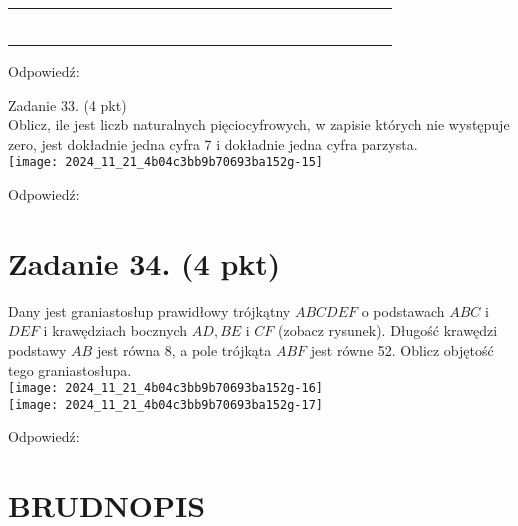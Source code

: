 \documentclass[10pt]{article}
\begin{document}
\begin{center}
\begin{tabular}{|c|c|c|c|c|c|c|c|c|c|c|c|c|c|c|c|c|c|c|c|c|c|c|c|}
\hline
 &  &  &  &  &  &  &  &  &  &  &  &  &  &  &  &  &  &  &  &  &  &  &  \\
\hline
 &  &  &  &  &  &  &  &  &  &  &  &  &  &  &  &  &  &  &  &  &  &  &  \\
\hline
 &  &  &  &  &  &  &  &  &  &  &  &  &  &  &  &  &  &  &  &  &  &  &  \\
\hline
 &  &  &  &  &  &  &  &  &  &  &  &  &  &  &  &  &  &  &  &  &  &  &  \\
\hline
 &  &  &  &  &  &  &  &  &  &  &  &  &  &  &  &  &  &  &  &  &  &  &  \\
\hline
 &  &  &  &  &  &  &  &  &  &  &  &  &  &  &  &  &  &  &  &  &  &  &  \\
\hline
 &  &  &  &  &  &  &  &  &  &  &  &  &  &  &  &  &  &  &  &  &  &  &  \\
\hline
\end{tabular}
\end{center}

Odpowiedź:

Zadanie 33. (4 pkt)\\
Oblicz, ile jest liczb naturalnych pięciocyfrowych, w zapisie których nie występuje zero, jest dokładnie jedna cyfra 7 i dokładnie jedna cyfra parzysta.\\
\texttt{[image: 2024\_11\_21\_4b04c3bb9b70693ba152g-15]}

Odpowiedź:

\section*{Zadanie 34. (4 pkt)}
Dany jest graniastosłup prawidłowy trójkątny \(A B C D E F\) o podstawach \(A B C\) i \(D E F\) i krawędziach bocznych \(A D, B E\) i \(C F\) (zobacz rysunek). Długość krawędzi podstawy \(A B\) jest równa 8, a pole trójkąta \(A B F\) jest równe 52. Oblicz objętość tego graniastosłupa.\\
\texttt{[image: 2024\_11\_21\_4b04c3bb9b70693ba152g-16]}\\
\texttt{[image: 2024\_11\_21\_4b04c3bb9b70693ba152g-17]}

Odpowiedź:

\section*{BRUDNOPIS}
\end{document}
